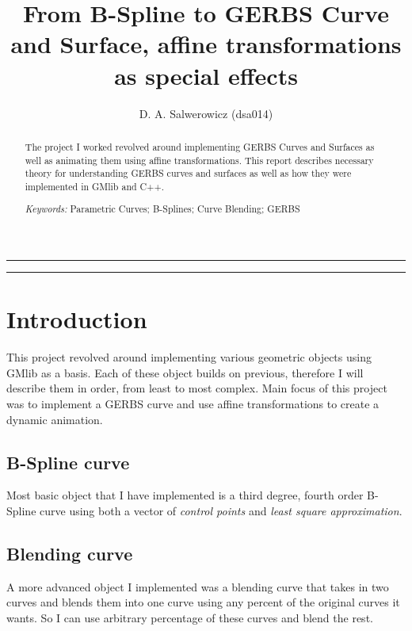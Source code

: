 \documentclass[a4paper,12pt]{extarticle}
\title{From B-Spline to GERBS Curve and Surface, affine transformations as special effects}
\author{D. A. Salwerowicz (dsa014)}
\date{\parbox{\linewidth}{\centering
    \textit{\small UiT - The Arctic University of Norway, P.O. Box 385, N-8505 Narvik, Norway}\endgraf\bigskip
    \small Submitted \today
}}
\providecommand{\keywords}[1]{\flushleft\textit{\small{Keywords:}} #1}
\begin{document}
  
\maketitle

\noindent\rule{\linewidth}{.5pt}
\begin{abstract} 
The project I worked revolved around implementing GERBS Curves and Surfaces as well as animating them using affine transformations. This report describes necessary theory for understanding GERBS curves and surfaces as well as how they were implemented in GMlib and C++.

\keywords{Parametric Curves; B-Splines; Curve Blending; GERBS}
\end{abstract}
\rule{\linewidth}{.5pt}


\section{Introduction}
This project revolved around implementing various geometric objects using GMlib as a basis. Each of these object builds on previous, therefore I will describe them in order, from least to most complex. Main focus of this project was to implement a GERBS curve and use affine transformations to create a dynamic animation.

\subsection{B-Spline curve}
Most basic object that I have implemented is a third degree, fourth order B-Spline curve using both a vector of \emph{control points} and \emph{least square approximation}.

\subsection{Blending curve}
A more advanced object I implemented was a blending curve that takes in two curves and blends them into one curve using any percent of the original curves it wants. So I can use arbitrary percentage of these curves and blend the rest.
\end{document}
